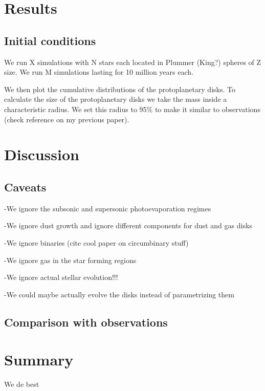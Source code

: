 \documentclass[fleqn,usenatbib]{mnras}
\begin{document}
\section{Results}
\label{sec:results}

\subsection{Initial conditions}
We run X simulations with N stars each located in Plummer (King?) spheres of Z size. We run M simulations lasting for 10 million years each. 

We then plot the cumulative distributions of the protoplanetary disks. To calculate the size of the protoplanetary disks we take the mass inside a characteristic radius. We set this radius to 95\% to make it similar to observations (check reference on my previous paper).

\section{Discussion}
\label{sec:discussion}

\subsection{Caveats}
-We ignore the subsonic and supersonic photoevaporation regimes 

-We ignore dust growth and ignore different components for dust and gas disks 

-We ignore binaries (cite cool paper on circumbinary stuff)

-We ignore gas in the star forming regions

-We ignore actual stellar evolution!!!

-We could maybe actually evolve the disks instead of parametrizing them

\subsection{Comparison with observations}

\section{Summary}
\label{sec:summary}

We de best

\bsp	%


\label{lastpage}
\end{document}
